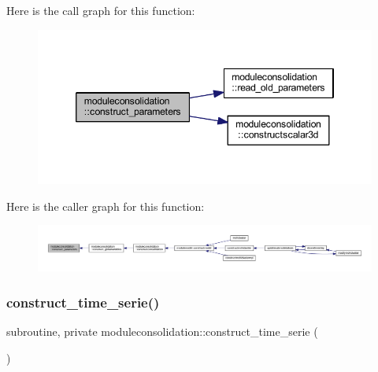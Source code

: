 Here is the call graph for this function\+:\nopagebreak
\begin{figure}[H]
\begin{center}
\leavevmode
\includegraphics[width=346pt]{namespacemoduleconsolidation_a4699e64424e9e130e7f46758181721ec_cgraph}
\end{center}
\end{figure}
Here is the caller graph for this function\+:\nopagebreak
\begin{figure}[H]
\begin{center}
\leavevmode
\includegraphics[width=350pt]{namespacemoduleconsolidation_a4699e64424e9e130e7f46758181721ec_icgraph}
\end{center}
\end{figure}
\mbox{\label{namespacemoduleconsolidation_a7138aa2bb0b64953d0ca37c18692d505}} 
\subsubsection{\texorpdfstring{construct\+\_\+time\+\_\+serie()}{construct\_time\_serie()}}
{\footnotesize\ttfamily subroutine, private moduleconsolidation\+::construct\+\_\+time\+\_\+serie (\begin{DoxyParamCaption}{ }\end{DoxyParamCaption})\hspace{0.3cm}{\ttfamily [private]}}

